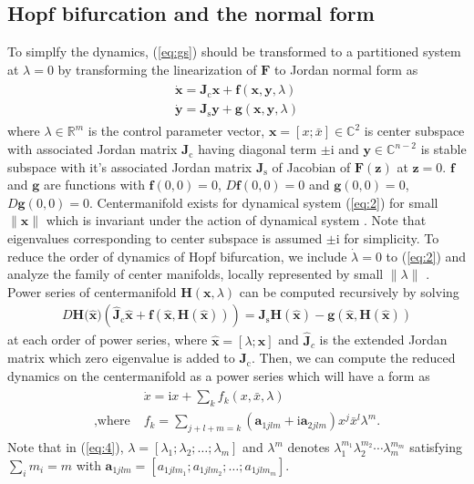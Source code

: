 \documentclass[openacc]{rsproca_new}%
\theoremstyle{own}
\def\real{\mathbb{R}}
\def\complex{\mathbb{C}}
\def\vec#1{\ensuremath{\mathbf{#1}}}
\newcommand{\Eref}[1]{(\ref{#1})}
\begin{document}
\subsection{Hopf bifurcation and the normal form}\label{SNF}

To simplfy the dynamics, \Eref{eq:gs} should be transformed to a partitioned system at \(\lambda=0\) by transforming the linearization of \(\vec{F}\) to Jordan normal form as
\begin{align}\label{eq:2}
  \begin{split}
    \dot{\vec{x}} =\vec{J}_\textrm{c} \vec{x} + \vec{f}(\vec{x},\vec{y},\lambda)\\
    \dot{\vec{y}} =\vec{J}_\textrm{s} \vec{y} +\vec{g}(\vec{x},\vec{y},\lambda)
  \end{split}
\end{align}
where $\lambda \in \real ^m$ is the control parameter vector, $\vec{x}=[x;\bar{x}]\in \complex^2$ is center subspace with associated Jordan matrix $\vec{J}_\textrm{c}$ having diagonal term $\pm\textrm{i}$ and $\vec{y}\in \complex^{n-2}$ is stable subspace with it's associated Jordan matrix $\vec{J}_\textrm{s}$ of Jacobian of $\vec{F}(\vec{z})$ at $\vec{z}=0$.
$\vec{f}$ and $\vec{g}$ are functions with $\vec{f}(0,0)=0$, $D\vec{f}(0,0)=0$ and $\vec{g}(0,0)=0$, $D\vec{g}(0,0)=0$. Centermanifold exists for dynamical system \Eref{eq:2} for small  $\|\vec{x}\|$ which is invariant under the action of dynamical system \cite{carr2012applications}. Note that eigenvalues corresponding to center subspace is assumed $\pm\textrm{i}$ for simplicity. To reduce the order of dynamics of Hopf bifurcation, we include $\dot\lambda=0$ to \Eref{eq:2} and analyze the family of center manifolds, locally represented by small $\|\lambda\|$  \cite{kuznetsov2013elements}. Power series of centermanifold $\vec{H}(\vec{x},\lambda)$ can be computed recursively by solving
\begin{align}\label{eq:3}
    D\vec{H}({\vec{\hat{x})}}(\vec{\hat{J}}_\textrm{c}\vec{\hat{x}}+\vec{f}(\vec{\hat{x}},\vec{H}(\vec{\hat{x}}))) =\vec{J}_\textrm{s} \vec{H}(\vec{\hat{x}})-\vec{g}(\vec{\hat{x}},\vec{H}(\vec{\hat {x}}))
\end{align}
at each order of power series, where \(\vec{\hat{x}}=[\lambda;\vec{x}]\) and \(\vec{\hat{J}}_c\) is the extended Jordan matrix which zero eigenvalue is added to \(\vec{J}_\textrm{c}\). Then, we can compute the reduced dynamics on the centermanifold as a power series which will have a form as
\begin{align}\label{eq:4}
  \begin{split}
    {}&\dot{x} =\textrm{i} x+\sum_k f_k(x,\bar{x},\lambda)\\
    ,\textrm{where} \; & f_k=\sum_{j+l+m=k}(\vec{a}_{1jlm}+\textrm{i}\vec{a}_{2jlm})x^j\bar{x}^l\lambda^m.
  \end{split}
\end{align}
Note that in \Eref{eq:4}, \(\lambda=[\lambda_1;\lambda_2;\ldots;\lambda_m]\) and \(\lambda^m\) denotes \(\lambda_1^{m_1}\lambda_2^{m_2}\cdots\lambda_m^{m_m}\) satisfying \(\sum_i m_i = m\) with \(\vec{a}_{1jlm}=[a_{1jlm_1};a_{1jlm_2};\ldots;a_{1jlm_m}]\).
\end{document}

